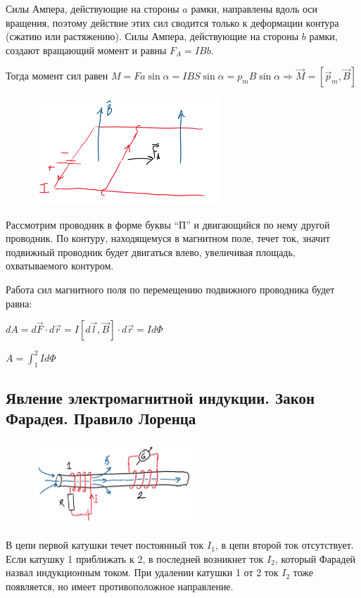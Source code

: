 \documentclass[12pt]{article}
\begin{document}
Силы Ампера, действующие на стороны $a$ рамки, направлены вдоль оси вращения, 
поэтому действие этих сил сводится только к деформации контура (сжатию или растяжению).
Силы Ампера, действующие на стороны $b$ рамки, создают вращающий момент и равны $F_A = IBb$.

Тогда момент сил равен $M = F a \sin \alpha = I B S \sin \alpha = p_m B \sin \alpha \Longrightarrow \vec{M} = [\vec{p}_m, \vec{B}]$

\begin{figure}
    \includegraphics[width=7cm]{physics2/images/physics2_2025_02_24_3}
\end{figure}

\Ex Рассмотрим проводник в форме буквы \enquote{П} и двигающийся по нему другой проводник. 
По контуру, находящемуся в магнитном поле, течет ток, значит подвижный проводник будет двигаться влево, 
увеличивая площадь, охватываемого контуром. 

Работа сил магнитного поля по перемещению подвижного проводника будет равна:

$dA = d\vec{F} \cdot d\vec{r} = I [d\vec{l}, \vec{B}] \cdot d\vec{r} = Id\Phi$

$A = \int_1^2 Id\Phi$


\subsection{Явление электромагнитной индукции. Закон Фарадея. Правило Лоренца}

\begin{figure}
    \includegraphics[width=6.2cm]{physics2/images/physics2_2025_02_24_4}
\end{figure}

В цепи первой катушки течет постоянный ток $I_1$, в цепи второй ток отсутствует. 
Если катушку 1 приближать к 2, в последней возникнет ток $I_2$, который Фарадей назвал индукционным током. 
При удалении катушки 1 от 2 ток $I_2$ тоже появляется, но имеет противоположное направление.
\end{document}
